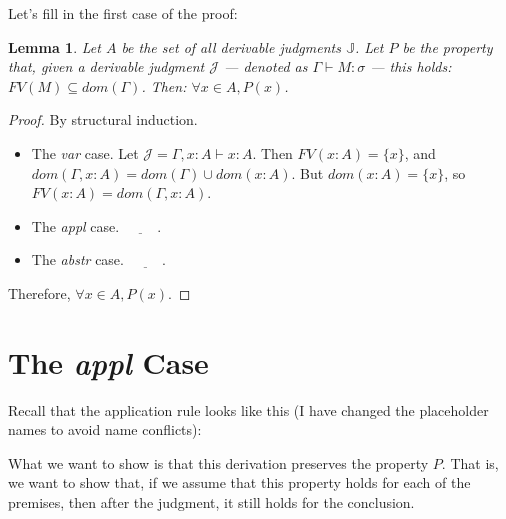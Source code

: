 \documentclass{book}
\numberwithin{equation}{chapter}
\newcommand{\blank}{\underline{\hspace{1cm}}}
\newtheorem*{anon-lemma}{Lemma}
\begin{document}
\noindent
Let's fill in the first case of the proof:

\noindent
\hrulefill

\begin{anon-lemma}
Let $A$ be the set of all derivable judgments $\mathbb{J}$. Let $P$ be the property that, given a derivable judgment $\mathcal{J}$ --- denoted as $\Gamma \vdash M : \sigma$ --- this holds: $FV(M) \subseteq dom(\Gamma)$. Then: $\forall x \in A, P(x)$.
\end{anon-lemma}

\begin{proof}
By structural induction.

\begin{itemize}
\item{The \textit{var} case. Let $\mathcal{J} = \Gamma, x : A \vdash x : A$. Then $FV(x : A) = \{ x \}$, and $dom(\Gamma, x : A) = dom(\Gamma) \cup dom(x : A)$. But $dom(x : A) = \{ x \}$, so $FV(x : A) = dom(\Gamma, x : A)$.}
\item{The \textit{appl} case. $\blank$.}
\item{The \textit{abstr} case. $\blank$.}
\end{itemize}

\noindent
Therefore, $\forall x \in A, P(x)$.
\end{proof}

\noindent
\hrulefill
\newline


\section{The \textit{appl} Case}

Recall that the application rule looks like this (I have changed the placeholder names to avoid name conflicts):

\begin{prooftree}
\end{prooftree}

\noindent
What we want to show is that this derivation preserves the property $P$. That is, we want to show that, if we assume that this property holds for each of the premises, then after the judgment, it still holds for the conclusion.


\end{document}
